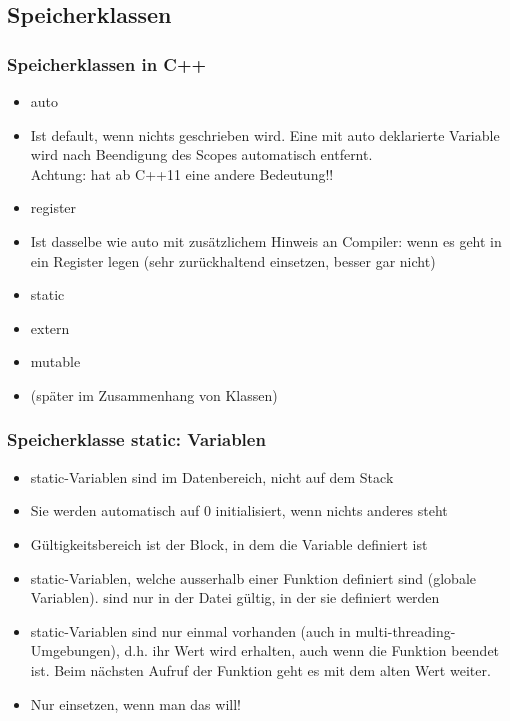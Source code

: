 
\subsection{Speicherklassen\hfill}
\label{sec:Speicherklassen}

\subsubsection{Speicherklassen in C++\hfill}
\label{sec:Speicherklassen in C++}
\begin{itemize}
	\item auto
	\item[\-] Ist default, wenn nichts geschrieben wird. Eine mit auto deklarierte Variable wird nach Beendigung des Scopes automatisch entfernt.\\
	Achtung: hat ab C++11 eine andere Bedeutung!!
	\item register
	\item[\-] Ist dasselbe wie auto mit zusätzlichem Hinweis an Compiler: wenn es geht in ein Register legen (sehr zurückhaltend einsetzen, besser gar nicht)
	\item static
	\item extern
	\item mutable
	\item[\-] (später im Zusammenhang von Klassen)
\end{itemize}

\subsubsection{Speicherklasse static: Variablen\hfill}
\label{sec:Speicherklasse static: Variablen}
\begin{itemize}
	\item static-Variablen sind im Datenbereich, nicht auf dem Stack
	\item Sie werden automatisch auf 0 initialisiert, wenn nichts anderes steht
	\item Gültigkeitsbereich ist der Block, in dem die Variable definiert ist
	\item static-Variablen, welche ausserhalb einer Funktion definiert sind (globale Variablen). sind nur in der Datei gültig, in der sie definiert werden
	\item static-Variablen sind nur einmal vorhanden (auch in multi-threading-Umgebungen), d.h. ihr Wert wird erhalten, auch wenn die Funktion beendet ist. Beim nächsten Aufruf der Funktion geht es mit dem alten Wert weiter.\color{\ownRed}
	\item Nur einsetzen, wenn man das will!\color{black}
\end{itemize}

